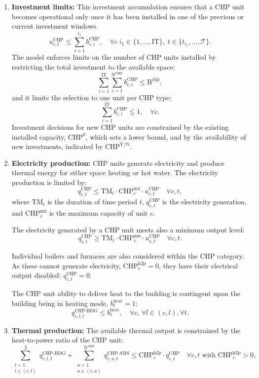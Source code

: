 \documentclass[11pt]{article}
\begin{document}
\begin{enumerate}
    \item \textbf{Investment limits:}  
    This investment accumulation ensures that a CHP unit becomes operational only once it has been installed in one of the previous or current investment windows.
    \[
    u^\text{CHP}_{c,t} \leq \sum_{i=1}^{i_1} b^\text{CHP}_{c,i}, \quad \forall c\; i_1 \in \{1, \dots, \text{IT}\}, \; t \in \{t_{i_1}, \dots, \mathcal{T}\}.
    \]
    The model enforces limits on the number of CHP units installed by restricting the total investment to the available space:
    \[
    \sum_{i=1}^{\text{IT}} \sum_{c=1}^{\text{N}^\text{CHP}} b^\text{CHP}_{c,i} \leq \text{B}^\text{chp},
    \]
    and it limits the selection to one unit per CHP type:
    \[
    \sum_{i=1}^{\text{IT}} b^\text{CHP}_{c,i} \leq 1, \quad \forall c.
    \]
    Investment decisions for new CHP units are constrained by the existing installed capacity, \(\text{CHP}^\text{0}\), which sets a lower bound, and by the availability of new investments, indicated by \(\text{CHP}^\text{Y/N}\).
    
    \item \textbf{Electricity production:}
    CHP units generate electricity and produce thermal energy for either space heating or hot water. The electricity production is limited by:
    \[
    q^\text{CHP}_{c,t} \leq \text{TM}_t \cdot \text{CHP}^\text{mx}_c \cdot u^\text{CHP}_{c,t} \quad \forall c,t,
    \]
    where \(\text{TM}_t\) is the duration of time period \(t\), \(q^\text{CHP}_{c,t}\) is the electricity generation, and \(\text{CHP}^\text{mx}_c\) is the maximum capacity of unit \(c\). 

    The electricity generated by a CHP unit meets also a minimum output level:
    \[
    q^\text{CHP}_{c,t} \geq \text{TM}_t \cdot \text{CHP}^\text{mn}_c \cdot u^\text{CHP}_{c,t} \quad \forall c,t.
    \]

    Individual boilers and furnaces are also considered within the CHP category. As these cannot generate electricity, \(\text{CHP}^\text{h2p}_c=0\), they have their electrical output disabled:
    \(q^\text{CHP}_{c,t}=0\).

    The CHP unit ability to deliver heat to the building is contingent upon the building being in heating mode, \(b^\text{heat}_t=1\):
    \[
    q^\text{CHP-BDG}_{c,l,t} \leq b^\text{heat}_t, \quad \forall c,\, \forall l \in (c,l), \forall t.
    \]

    \item \textbf{Thermal production:}
    The available thermal output is constrained by the heat-to-power ratio of the CHP unit:
    \[
    \sum_{\substack{l=1 \\ l \in (c,l)}}^{2} q^\text{CHP-BDG}_{c,l,t} + \sum_{\substack{a=1 \\ a \in (c,a)}}^{\text{N}^\text{ABS}} q^\text{CHP-ABS}_{c,a,t} \leq \text{CHP}^\text{h2p}_c \cdot q^\text{CHP}_{c,t} \quad \forall c,t \text{ with } \text{CHP}^\text{h2p}_c > 0,
    \]


\end{enumerate}
\end{document}
